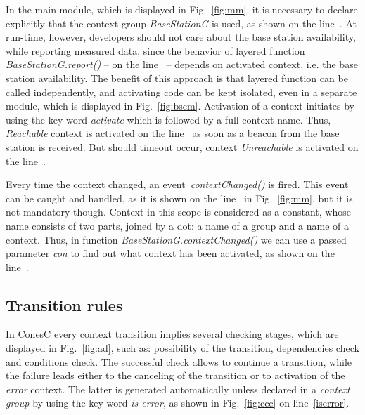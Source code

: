 In the main module, which is displayed in Fig.~\ref{fig:mm}, it is necessary to declare
explicitly that the context group \emph{BaseStationG} is used, as shown on the line~.
At run-time, however, developers should not care about the base station availability, while
reporting measured data, since the behavior of layered function
\emph{BaseStationG.report()} -- on the line~ -- depends on activated
context, i.e. the base station availability. The benefit of
this approach is that layered function can be called independently, and activating code
can be kept isolated, even in a separate module, which is displayed in Fig.~\ref{fig:bscm}.
Activation of a context initiates by using the key-word
\emph{activate} which is followed by a full context name. Thus,
\emph{Reachable} context is activated on the line~ as soon as a
beacon from the base station is received. But should timeout occur, context
\emph{Unreachable} is activated on the line~.



Every time the context changed, an event~\emph{contextChanged()} is fired. This event can be
caught and handled, as it is shown on the line~ in Fig.~\ref{fig:mm},
but it is not mandatory though. Context in this scope is considered as a constant,
whose name consists of two parts, joined by a dot: a name of a group and a name
of a context. Thus, in function \emph{BaseStationG.contextChanged()} we can use
a passed parameter \emph{con} to find out what context has been activated, as
shown on the line~.

\subsection{Transition rules}\label{subsec:rules}

In ConesC every context transition implies several checking stages, which are displayed in
Fig.~\ref{fig:ad}, such as: possibility of the transition, dependencies check and conditions
check. The successful check allows to continue a transition, while the failure leads either to
the canceling of the transition or to activation of the \emph{error} context. The latter is generated
automatically unless declared in a \emph{context group} by using the key-word \emph{is error},
as shown in Fig.~\ref{fig:ccc} on line~\ref{iserror}.

